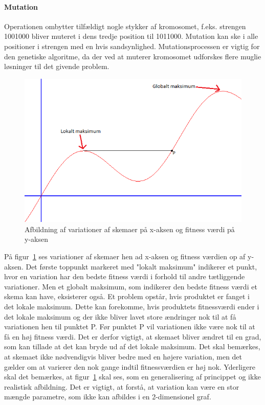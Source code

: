 \paragraph{Mutation}
Operationen ombytter tilfældigt nogle stykker af kromosomet, f.eks. strengen 1001000 bliver muteret i dens tredje position til 1011000. Mutation kan ske i alle positioner i strengen med en hvis sandsynlighed. Mutationsprocessen er vigtig for den genetiske algoritme, da der ved at muterer kromosomet udforskes flere muglie løsninger til det givende problem.
\begin{figure}[!h]
  \includegraphics[scale = 1]{partials/graphics/lokaltmaksimum.png}
  \caption{Afbildning af variationer af skemaer på x-aksen og fitness værdi på y-aksen}
  \label{fig:Lokalmax}
\end{figure}

På figur~\ref{fig:Lokalmax} ses variationer af skemaer hen ad x-aksen og fitness værdien op af y-aksen. Det første toppunkt markeret med "lokalt maksimum" indikerer et punkt, hvor en variation har den bedste fitness værdi i forhold til andre tætliggende variationer. Men et globalt maksimum, som indikerer den bedste fitness værdi et skema kan have, eksisterer også. Et problem opstår, hvis produktet er fanget i det lokale maksimum. Dette kan forekomme, hvis produktets fitnessværdi ender i det lokale maksimum og der ikke bliver lavet store ændringer nok til at få variationen hen til punktet P. Før punktet P vil variationen ikke være nok til at få en høj fitness værdi. Det er derfor vigtigt, at skemaet bliver ændret til en grad, som kan tillade at det kan bryde ud af det lokale maksimum. Det skal bemærkes, at skemaet ikke nødvendigvis bliver bedre med en højere variation, men det gælder om at varierer den nok gange indtil fitnessværdien er høj nok. Yderligere skal det bemærkes, at figur~\ref{fig:Lokalmax} skal ses, som en generalisering af princippet og ikke realistisk afbildning. Det er vigtigt, at forstå, at variation kan være en stor mængde parametre, som ikke kan afbildes i en 2-dimensionel graf.

